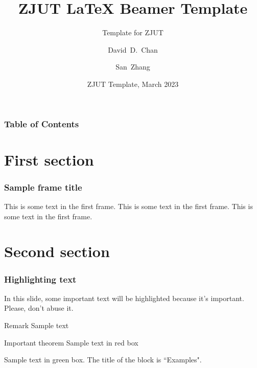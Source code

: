 \documentclass{beamer}
\title[About Beamer]
{ZJUT {\LaTeX} Beamer Template}
\subtitle{Template for ZJUT}
\author[Chan, Zhang] %
{David~D.~Chan\inst{1} \and San~Zhang\inst{2}}
\institute[ZJUT] %
{
  \inst{1}%
  College of Computer Science and Technology\\
  Zhejiang University of Technology
  \and
  \inst{2}%
  College of Chemical Engineering\\
  Zhejiang University of Technology
}
\date[ZJUT 2023] %
{ZJUT Template, March 2023}
\begin{document}
\frame{\titlepage}

\begin{frame}
\frametitle{Table of Contents}
\tableofcontents
\end{frame}

\section{First section}

\begin{frame}
\frametitle{Sample frame title}
This is some text in the first frame. This is some text in the first frame. This is some text in the first frame.
\end{frame}

\section{Second section}

\begin{frame}
\frametitle{Highlighting text}

In this slide, some important text will be
\alert{highlighted} because it's important.
Please, don't abuse it.

\begin{block}{Remark}
Sample text
\end{block}

\begin{alertblock}{Important theorem}
Sample text in red box
\end{alertblock}

\begin{examples}
Sample text in green box. The title of the block is ``Examples".
\end{examples}
\end{frame}
\end{document}
